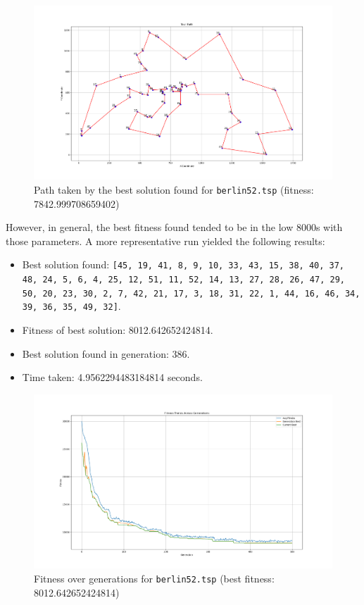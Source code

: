 \documentclass[a4paper]{article}
\begin{document}
\begin{figure}[H]
    \centering
    \includegraphics[width=\textwidth]{./images/berlin52besttour.png}
    \caption{Path taken by the best solution found for \texttt{berlin52.tsp} (fitness: 7842.999708659402)}
\end{figure}

However, in general, the best fitness found tended to be in the low 8000s with those parameters.
A more representative run yielded the following results:
\begin{itemize}
    \item   Best solution found: \texttt{[45, 19, 41, 8, 9, 10, 33, 43, 15, 38, 40, 37, 48, 24, 5, 6, 4, 25, 12, 51, 11, 52, 14, 13, 27, 28, 26, 47, 29, 50, 20, 23, 30, 2, 7, 42, 21, 17, 3, 18, 31, 22, 1, 44, 16, 46, 34, 39, 36, 35, 49, 32]}.
    \item   Fitness of best solution: 8012.642652424814.
    \item   Best solution found in generation: 386.
    \item   Time taken: 4.9562294483184814 seconds.
\end{itemize}

\begin{figure}[H]
    \centering
    \includegraphics[width=\textwidth]{./images/berlin52rep.png}
    \caption{Fitness over generations for \texttt{berlin52.tsp} (best fitness: 8012.642652424814)}
\end{figure}
\end{document}
